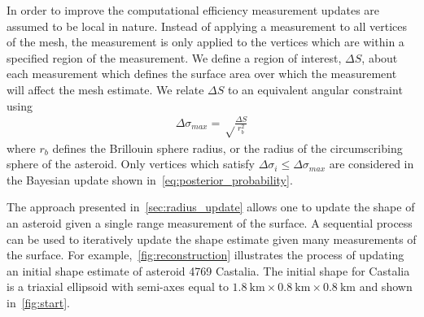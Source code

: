 In order to improve the computational efficiency measurement updates are assumed to be local in nature.
Instead of applying a measurement to all vertices of the mesh, the measurement is only applied to the vertices which are within a specified region of the measurement. 
We define a region of interest, \( \Delta S \), about each measurement which defines the surface area over which the measurement will affect the mesh estimate.
We relate \( \Delta S \) to an equivalent angular constraint using
\begin{align}\label{eq:region_of_interest}
    \Delta \sigma_{max} = \sqrt \frac{\Delta S}{r_b^2}
\end{align}
where \( r_b \) defines the Brillouin  sphere radius, or the radius of the circumscribing sphere of the asteroid.
Only vertices which satisfy \( \Delta \sigma_i \leq \Delta \sigma_{max} \) are considered in the Bayesian update shown in~\cref{eq:posterior_probability}.

The approach presented in~\cref{sec:radius_update} allows one to update the shape of an asteroid given a single range measurement of the surface.
A sequential process can be used to iteratively update the shape estimate given many measurements of the surface. 
For example,~\cref{fig:reconstruction} illustrates the process of updating an initial shape estimate of asteroid 4769 Castalia.
The initial shape for Castalia is a triaxial ellipsoid with semi-axes equal to \( \SI{1.8}{\kilo\meter} \times \SI{0.8}{\kilo\meter} \times \SI{0.8}{\kilo\meter}\) and shown in~\cref{fig:start}.

